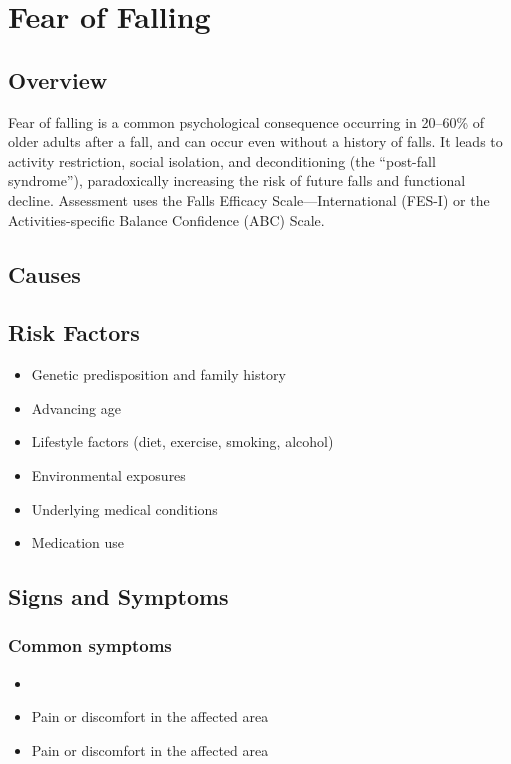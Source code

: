 \chapter{Fear of Falling}
\label{sec:Fear of Falling}

\section{Overview}
Fear of falling is a common psychological consequence occurring in 20--60\% of older adults after a fall, and can occur even without a history of falls. It leads to activity restriction, social isolation, and deconditioning (the ``post-fall syndrome''), paradoxically increasing the risk of future falls and functional decline. Assessment uses the Falls Efficacy Scale---International (FES-I) or the Activities-specific Balance Confidence (ABC) Scale.
\section{Causes}
\section{Risk Factors}

\begin{itemize}[noitemsep]
  \item Genetic predisposition and family history
  \item Advancing age
  \item Lifestyle factors (diet, exercise, smoking, alcohol)
  \item Environmental exposures
  \item Underlying medical conditions
  \item Medication use
\end{itemize}
\section{Signs and Symptoms}

\subsection{Common symptoms}
\begin{itemize}[noitemsep]
  \item \item Pain or discomfort in the affected area    \item Pain or discomfort in the affected area
  \end{itemize}

